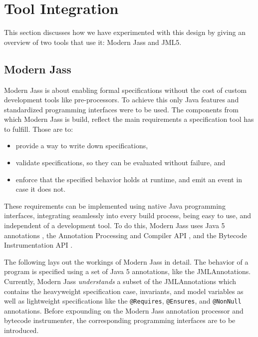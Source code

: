 \documentclass{llncs}
\begin{document}
\section{Tool Integration}

This section discusses how we have experimented with this design by giving an overview of two tools that use it: Modern Jass and JML5.

\subsection{Modern Jass}
Modern Jass is about enabling formal specifications without the cost of custom development tools like pre-processors. To achieve this only Java features and standardized programming interfaces were to be used. The components from which Modern Jass is build, reflect the main requirements a specification tool has to fulfill. Those are to:
\begin{itemize}
\item provide a way to write down specifications, 
\item validate specifications, so they can be evaluated without failure, and 
\item enforce that the specified behavior holds at runtime, and emit an event in case it does not.
\end{itemize}
These requirements can be implemented using native Java programming interfaces, integrating seamlessly into every build process, being easy to use, and independent of a development tool. To do this, Modern Jass uses Java 5 annotations \cite{Gosling-etal05a},  the Annotation Processing and Compiler API \cite{Darcy:2006:JSR269,Gafter:2002:JSR199}, and the Bytecode Instrumentation API \cite{Sun:Instrument}.

The following lays out the workings of Modern Jass in detail.  The behavior of a program is specified using a set of Java 5 annotations, like the JMLAnnotations. Currently, Modern Jass \textit{understands} a subset of the JMLAnnotations which contains the heavyweight specification case, invariants, and model variables as well as lightweight specifications like the \lstinline[language={[JML5]Java}]{@Requires}, \lstinline[language={[JML5]Java}]{@Ensures}, and \lstinline[language={[JML5]Java}]{@NonNull} annotations. Before expounding on the Modern Jass annotation processor and bytecode instrumenter, the corresponding programming interfaces are to be introduced.
\end{document}

